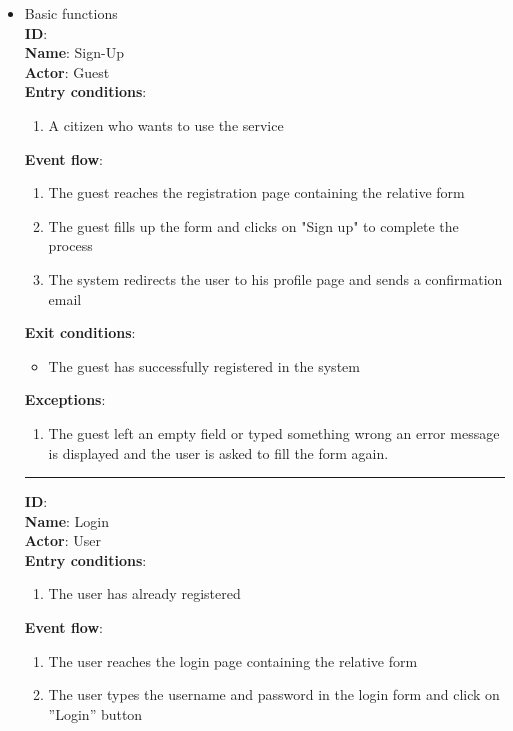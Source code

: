 \begin{enumerate}
\begin{itemize}
    \item {Basic functions}\\
		\textbf{ID}:  \\
		\textbf{Name}: Sign-Up \\
		\textbf{Actor}: Guest \\
		\textbf{Entry conditions}:
		\begin{enumerate}
			\item{A citizen who wants to use the service}
		\end{enumerate}
		\textbf{Event flow}:
		\begin{enumerate}
			\item{The guest reaches the registration page containing the relative form}
			\item{The guest ﬁlls up the form and clicks on "Sign up" to complete the process}
			\item{The system redirects the user to his proﬁle page and sends a conﬁrmation email}
		\end{enumerate}
		\textbf{Exit conditions}:
		\begin{itemize}
			\item{The guest has successfully registered in the system}
		\end{itemize}
		\textbf{Exceptions}:
		\begin{enumerate}
      		\item{The guest left an empty ﬁeld or typed something wrong an error message is displayed and the user is asked to ﬁll the form again.}
 		   \end{enumerate}
		\rule{\linewidth}{0.4pt}
		\textbf{ID}:  \\
		\textbf{Name}: Login \\
		\textbf{Actor}: User \\
		\textbf{Entry conditions}:
		\begin{enumerate}
			\item{The user has already registered}
		\end{enumerate}
		\textbf{Event flow}:
		\begin{enumerate}
			\item{The user reaches the login page containing the relative form}
			\item{The user types the username and password in the login form and click on ”Login” button}

\end{enumerate}
\end{itemize}
\end{enumerate}
